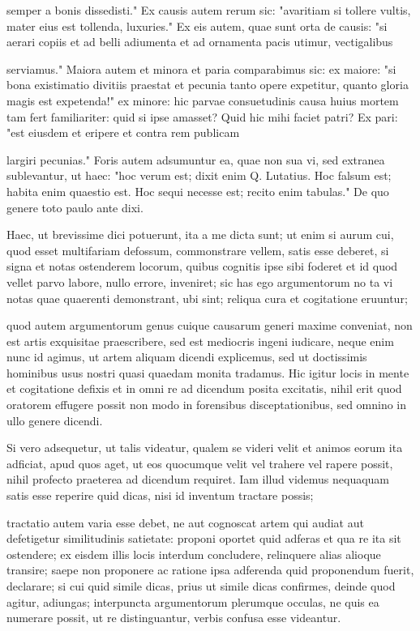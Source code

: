  semper a bonis dissedisti." Ex causis autem rerum sic: "avaritiam si tollere vultis, mater eius est tollenda, luxuries." Ex eis autem, quae sunt orta de causis: "si aerari copiis et ad belli adiumenta et ad ornamenta pacis utimur, vectigalibus

 serviamus." Maiora autem et minora et paria comparabimus sic: ex maiore: "si bona existimatio divitiis praestat et pecunia tanto opere expetitur, quanto gloria magis est expetenda!" ex minore: hic parvae consuetudinis causa huius mortem tam fert familiariter: quid si ipse amasset? Quid hic mihi faciet patri? Ex pari: "est eiusdem et eripere et contra rem publicam

 largiri pecunias." Foris autem adsumuntur ea, quae non sua vi, sed extranea sublevantur, ut haec: "hoc verum est; dixit enim Q. Lutatius. Hoc falsum est; habita enim quaestio est. Hoc sequi necesse est; recito enim tabulas." De quo genere toto paulo ante dixi.

 Haec, ut brevissime dici potuerunt, ita a me dicta sunt; ut enim si aurum cui, quod esset multifariam defossum, commonstrare vellem, satis esse deberet, si signa et notas ostenderem locorum, quibus cognitis ipse sibi foderet et id quod vellet parvo labore, nullo errore, inveniret; sic has ego argumentorum no ta vi notas quae quaerenti demonstrant, ubi sint; reliqua cura et cogitatione eruuntur;

 quod autem argumentorum genus cuique causarum generi maxime conveniat, non est artis exquisitae praescribere, sed est mediocris ingeni iudicare, neque enim nunc id agimus, ut artem aliquam dicendi explicemus, sed ut doctissimis hominibus usus nostri quasi quaedam monita tradamus. Hic igitur locis in mente et cogitatione defixis et in omni re ad dicendum posita excitatis, nihil erit quod oratorem effugere possit non modo in forensibus disceptationibus, sed omnino in ullo genere dicendi.

 Si vero adsequetur, ut talis videatur, qualem se videri velit et animos eorum ita adficiat, apud quos aget, ut eos quocumque velit vel trahere vel rapere possit, nihil profecto praeterea ad dicendum requiret. Iam illud videmus nequaquam satis esse reperire quid dicas, nisi id inventum tractare possis;

 tractatio autem varia esse debet, ne aut cognoscat artem qui audiat aut defetigetur similitudinis satietate: proponi oportet quid adferas et qua re ita sit ostendere; ex eisdem illis locis interdum concludere, relinquere alias alioque transire; saepe non proponere ac ratione ipsa adferenda quid proponendum fuerit, declarare; si cui quid simile dicas, prius ut simile dicas confirmes, deinde quod agitur, adiungas; interpuncta argumentorum plerumque occulas, ne quis ea numerare possit, ut re distinguantur, verbis confusa esse videantur.

